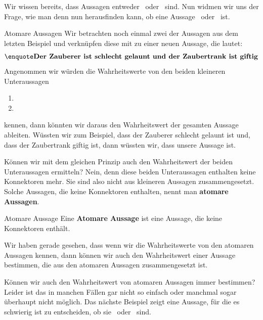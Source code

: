 \documentclass[../../main.tex]{subfiles}
\begin{document}
Wir wissen bereits, dass Aussagen entweder \wahr\  oder \falsch\  sind.
Nun widmen wir uns der Frage, wie man denn nun herausfinden kann, 
ob eine Aussage \wahr\  oder \falsch\  ist. 

\begin{example}{Atomare Aussagen}
    Wir betrachten noch einmal zwei der Aussagen aus dem letzten Beispiel und verknüpfen diese mit  zu einer neuen Aussage, die lautet:
    \[\statement{Der Zauberer ist schlecht gelaunt und der Zaubertrank ist giftig}\]
    Angenommen wir würden die Wahrheitswerte von den beiden kleineren Unteraussagen
    \begin{enumerate}
        \item {}
        \item {}
    \end{enumerate}
    kennen, dann könnten wir daraus den Wahrheitswert der gesamten Aussage ableiten.
    Wüssten wir zum Beispiel, dass der Zauberer schlecht gelaunt ist und, dass der Zaubertrank giftig ist, dann wüssten
    wir, dass unsere Aussage  \wahr{} ist.
    
    Können wir mit dem gleichen Prinzip auch den Wahrheitswert der beiden Unteraussagen ermitteln? Nein, denn diese beiden Unteraussagen enthalten keine Konnektoren mehr. Sie sind also nicht aus kleineren Aussagen zusammengesetzt. Solche Aussagen, die keine Konnektoren enthalten, nennt man \textbf{atomare Aussagen}.
\end{example}

\begin{definition} {Atomare Aussage}
Eine \textbf{Atomare Aussage} ist eine Aussage, die keine Konnektoren enthält.
\end{definition}

Wir haben gerade gesehen, dass wenn wir die Wahrheitswerte von den atomaren
Aussagen kennen, dann können wir auch den Wahrheitswert einer Aussage bestimmen,
die aus den atomaren Aussagen zusammengesetzt ist.

Können wir auch den Wahrheitswert von atomaren 
Aussagen immer bestimmen? Leider ist das in manchen Fällen gar nicht so einfach 
oder manchmal sogar 
überhaupt nicht möglich. Das nächste Beispiel zeigt eine Aussage, für die es
schwierig ist zu entscheiden, ob sie \wahr\  oder \falsch\  sind.
\end{document}
